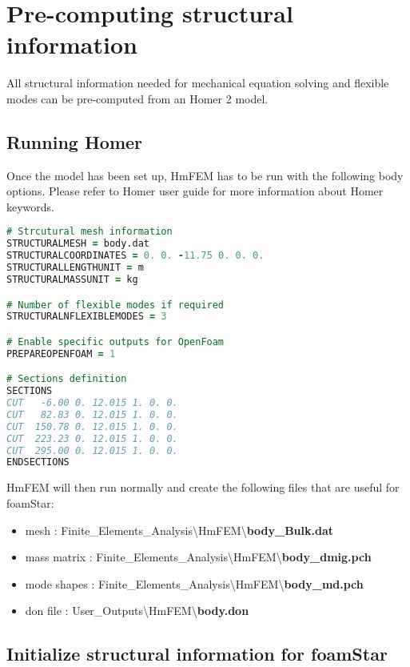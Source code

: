 \chapter{Pre-computing structural information}

All structural information needed for mechanical equation solving and flexible modes can be pre-computed from an Homer 2 model.

\section{Running Homer}
Once the model has been set up, HmFEM has to be run with the following body options. Please refer to Homer user guide for more information about Homer keywords.

\begin{lstlisting}[language=fortran]
# Strcutural mesh information
STRUCTURALMESH = body.dat
STRUCTURALCOORDINATES = 0. 0. -11.75 0. 0. 0.
STRUCTURALLENGTHUNIT = m
STRUCTURALMASSUNIT = kg

# Number of flexible modes if required
STRUCTURALNFLEXIBLEMODES = 3

# Enable specific outputs for OpenFoam
PREPAREOPENFOAM = 1

# Sections definition
SECTIONS
CUT   -6.00 0. 12.015 1. 0. 0.
CUT   82.83 0. 12.015 1. 0. 0.
CUT  150.78 0. 12.015 1. 0. 0.
CUT  223.23 0. 12.015 1. 0. 0.
CUT  295.00 0. 12.015 1. 0. 0.
ENDSECTIONS
\end{lstlisting}

HmFEM will then run normally and create the following files that are useful for foamStar:
\begin{itemize}
\item mesh : Finite\_Elements\_Analysis{\textbackslash}HmFEM{\textbackslash}\textbf{body\_Bulk.dat}
\item mass matrix : Finite\_Elements\_Analysis{\textbackslash}HmFEM{\textbackslash}\textbf{body\_dmig.pch}
\item mode shapes : Finite\_Elements\_Analysis{\textbackslash}HmFEM{\textbackslash}\textbf{body\_md.pch}
\item don file : User\_Outputs{\textbackslash}HmFEM{\textbackslash}\textbf{body.don}
\end{itemize}

\section{Initialize structural information for foamStar}

